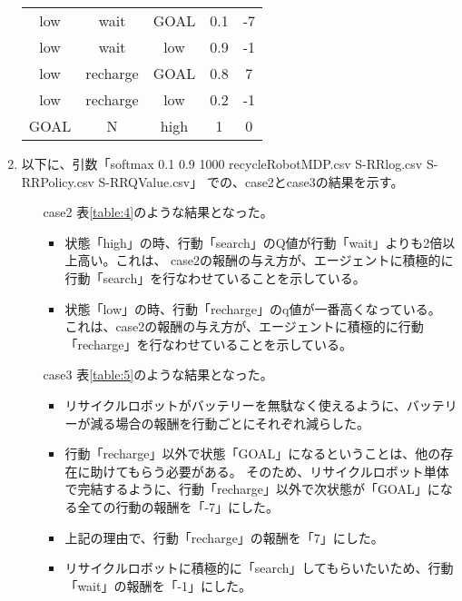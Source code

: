 \begin{enumerate}
\begin{table}
\begin{minipage}[t]{0.45\hsize}
\begin{tabular}{|c|c|c|c|c|}
            \hline
            low & wait & GOAL & 0.1 & -7 \\
            low & wait & low & 0.9 & -1 \\
            \hline
            low & recharge & GOAL & 0.8 & 7 \\
            low & recharge & low & 0.2 & -1 \\
            \hline
            GOAL & N & high & 1 & 0 \\
            \hline
          \end{tabular}
        \end{minipage}
  \end{table}
  
  \item 以下に、引数「softmax 0.1 0.9 1000 recycleRobotMDP.csv S-RRlog.csv S-RRPolicy.csv S-RRQValue.csv」
  での、case2とcase3の結果を示す。
  \begin{itemize}
    \item[case2] 表\ref{table:4}のような結果となった。
    \begin{itemize}
      \item 状態「high」の時、行動「search」のQ値が行動「wait」よりも2倍以上高い。これは、
      case2の報酬の与え方が、エージェントに積極的に行動「search」を行なわせていることを示している。
      \item 状態「low」の時、行動「recharge」のq値が一番高くなっている。
      これは、case2の報酬の与え方が、エージェントに積極的に行動「recharge」を行なわせていることを示している。
    \end{itemize}
    \item[case3] 表\ref{table:5}のような結果となった。
    \begin{itemize}
      \item リサイクルロボットがバッテリーを無駄なく使えるように、バッテリーが減る場合の報酬を行動ごとにそれぞれ減らした。
      \item 行動「recharge」以外で状態「GOAL」になるということは、他の存在に助けてもらう必要がある。
      そのため、リサイクルロボット単体で完結するように、行動「recharge」以外で次状態が「GOAL」になる全ての行動の報酬を「-7」にした。
      \item 上記の理由で、行動「recharge」の報酬を「7」にした。
      \item リサイクルロボットに積極的に「search」してもらいたいため、行動「wait」の報酬を「-1」にした。
    \end{itemize}
  \end{itemize}
  \begin{table}

\end{table}
\end{enumerate}
